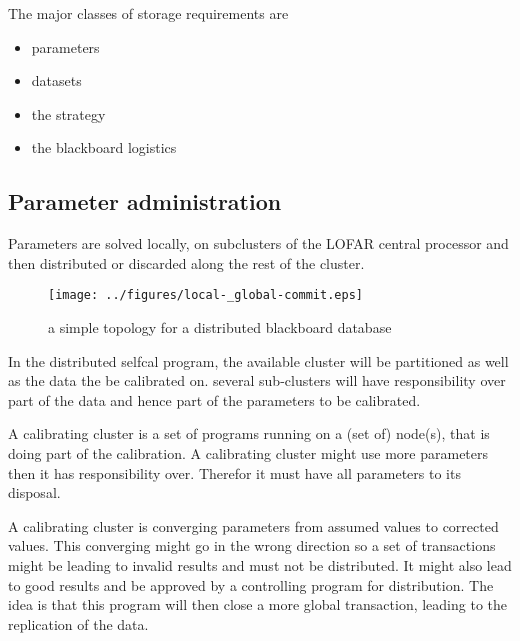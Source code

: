 \documentclass[]{lofar}
\begin{document}
    The major classes of storage requirements are

    \begin{itemize}

      \item 

        parameters

      \item 

        datasets

      \item 

        the strategy

      \item 

        the blackboard logistics

    \end{itemize}

    \subsection{Parameter administration}
    \label{subsec:parameter-administration}\hypertarget{subsec:parameter-administration}{}

      Parameters are solved locally, on subclusters of the LOFAR
      central processor and then distributed or discarded along the
      rest of the cluster.

      \begin{figure}
        \texttt{[image: ../figures/local-\_global-commit.eps]}
        \hypertarget{fig:localGlobalCommit}{}
        \caption{a simple topology for a distributed blackboard database\label{fig:localGlobalCommit}}
      \end{figure}

      In the distributed selfcal program, the available cluster will
      be partitioned as well as the data the be calibrated on. several
      sub-clusters will have responsibility over part of the data and
      hence part of the parameters to be calibrated.

      A calibrating cluster is a set of programs running on a (set of)
      node(s), that is doing part of the calibration.  A calibrating
      cluster might use more parameters then it has responsibility
      over. Therefor it must have all parameters to its disposal.

      A calibrating cluster is converging parameters from assumed
      values to corrected values. This converging might go in the
      wrong direction so a set of transactions might be leading to
      invalid results and must not be distributed. It might also lead
      to good results and be approved by a controlling program for
      distribution. The idea is that this program will then close a
      more global transaction, leading to the replication of the data.
\end{document}

